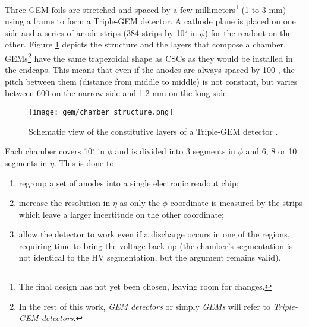             Three GEM foils are stretched and spaced by a few millimeters\footnote{The final design has not yet been chosen, leaving room for changes.} (1 to 3 mm) using a frame to form a Triple-GEM detector. A cathode plane is placed on one side and a series of anode strips (384 strips by 10$ ^\circ $ in $ \phi $) for the readout on the other. Figure \ref{fig:gas_electron_multiplier_detectors__structure} depicts the structure and the layers that compose a chamber. GEMs\footnote{In the rest of this work, \emph{GEM detectors} or simply \emph{GEMs} will refer to \emph{Triple-GEM detectors}.} have the same trapezoidal shape as CSCs as they would be installed in the endcaps. This means that even if the anodes are always spaced by 100 \um{}, the pitch between them (distance from middle to middle) is not constant, but varies between 600 \um{} on the narrow side and 1.2 mm on the long side. \\

            \begin{figure}[h!]
                \centering
                \texttt{[image: gem/chamber\_structure.png]}
                \caption{Schematic view of the constitutive layers of a Triple-GEM detector \Cite{GEM_Test_in_Beam_1}.}
                \label{fig:gas_electron_multiplier_detectors__structure}
            \end{figure}        

            Each chamber covers 10$ ^\circ $ in $ \phi $ and is divided into 3 segments in $ \phi $ and 6, 8 or 10 segments in $ \eta $. This is done to
            \begin{enumerate}
                \item regroup a set of anodes into a single electronic readout chip; 
                \item increase the resolution in $ \eta $ as only the $ \phi $ coordinate is measured by the strips which leave a larger incertitude on the other coordinate;
                \item allow the detector to work even if a discharge occurs in one of the regions, requiring time to bring the voltage back up (the chamber's segmentation is not identical to the HV segmentation, but the argument remains valid).
            \end{enumerate}

